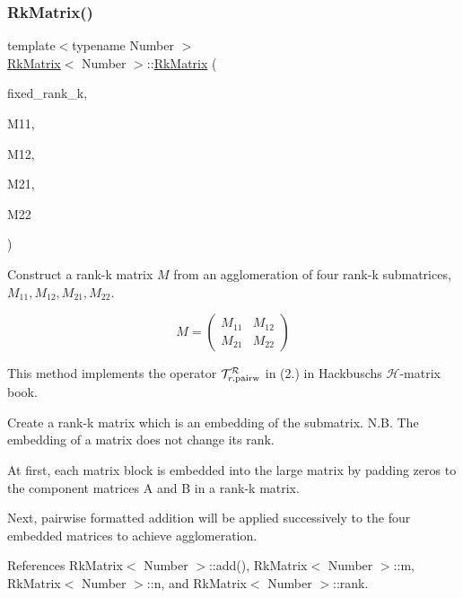 \subsubsection{\texorpdfstring{Rk\+Matrix()}{RkMatrix()}\hspace{0.1cm}{\footnotesize\ttfamily [16/18]}}
{\footnotesize\ttfamily template$<$typename Number $>$ \\
\hyperlink{classRkMatrix}{Rk\+Matrix}$<$ Number $>$\+::\hyperlink{classRkMatrix}{Rk\+Matrix} (\begin{DoxyParamCaption}\item[{const \hyperlink{classRkMatrix_add060bfc3a4cc77f858c3d6dd58cadd5}{size\+\_\+type}}]{fixed\+\_\+rank\+\_\+k,  }\item[{const \hyperlink{classRkMatrix}{Rk\+Matrix}$<$ Number $>$ \&}]{M11,  }\item[{const \hyperlink{classRkMatrix}{Rk\+Matrix}$<$ Number $>$ \&}]{M12,  }\item[{const \hyperlink{classRkMatrix}{Rk\+Matrix}$<$ Number $>$ \&}]{M21,  }\item[{const \hyperlink{classRkMatrix}{Rk\+Matrix}$<$ Number $>$ \&}]{M22 }\end{DoxyParamCaption})}

Construct a rank-\/k matrix $M$ from an agglomeration of four rank-\/k submatrices, $M_{11}, M_{12}, M_{21}, M_{22}$.

\[ M = \begin{pmatrix} M_{11} & M_{12} \\ M_{21} & M_{22} \end{pmatrix} \]


\begin{DoxyDescription}
\item[Note ]This method implements the operator $\mathcal{T}_{r, {\rm pairw}}^{\mathcal{R}}$ in (2.) in Hackbusch\textquotesingle{}s $\mathcal{H}$-\/matrix book. 
\end{DoxyDescription}Create a rank-\/k matrix which is an embedding of the submatrix. N.\+B. The embedding of a matrix does not change its rank.

At first, each matrix block is embedded into the large matrix by padding zeros to the component matrices {\ttfamily A} and {\ttfamily B} in a rank-\/k matrix.

Next, pairwise formatted addition will be applied successively to the four embedded matrices to achieve agglomeration.

References Rk\+Matrix$<$ Number $>$\+::add(), Rk\+Matrix$<$ Number $>$\+::m, Rk\+Matrix$<$ Number $>$\+::n, and Rk\+Matrix$<$ Number $>$\+::rank.

